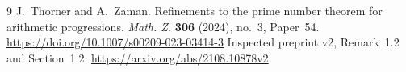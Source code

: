 \documentclass[12pt,reqno]{amsart}
\theoremstyle{blueplain}
\numberwithin{equation}{section}
\begin{document}
\begin{thebibliography}{9}
 \hypertarget{abbr-source:ThornerZaman2024}{}
J.~Thorner and A.~Zaman. Refinements to the prime number theorem for
arithmetic progressions. \emph{Math. Z.} \textbf{306} (2024), no.~3,
Paper~54. \url{https://doi.org/10.1007/s00209-023-03414-3} Inspected
preprint v2, Remark~1.2 and Section~1.2: %
\url{https://arxiv.org/abs/2108.10878v2}.
\end{thebibliography}
\end{document}
